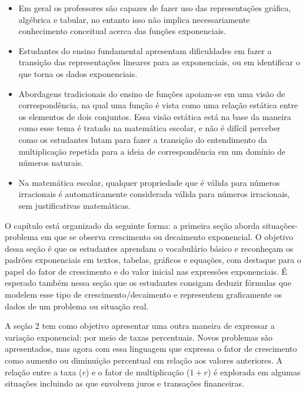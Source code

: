 \begin{apresentacao}
\begin{itemize}
\item Em geral os professores são capazes de fazer uso das representações gráfica, algébrica e tabular, no entanto isso não implica necessariamente conhecimento conceitual acerca das funções exponenciais. \citep{Presmeg2005}

\item Estudantes do ensino fundamental apresentam dificuldades em fazer a transição das representações lineares para as exponenciais, ou em identificar o que torna os dados exponenciais. \citep{Alagic2006}

\item Abordagens tradicionais do ensino de funções apoiam-se em uma visão de correspondência, na qual uma função é vista como uma relação estática entre os elementos de dois conjuntos. Essa visão estática está na base da maneira como esse tema é tratado na matemática escolar, e não é difícil perceber como os estudantes lutam para fazer a transição do entendimento da multiplicação repetida para a ideia de correspondência em um domínio de números naturais. \citep{Ellis2012}

\item Na matemática escolar, qualquer propriedade que é válida para números irracionais é automaticamente considerada válida para números irracionais, sem justificativas matemáticas. \citep{Wu2011}

\end{itemize}

O capítulo está organizado da seguinte forma: a primeira seção aborda situações-problema em que se observa crescimento ou decaimento exponencial. O objetivo dessa seção é que os estudantes aprendam o vocabulário básico e reconheçam os padrões exponenciais em textos, tabelas, gráficos e equações, com destaque para o papel do fator de crescimento e do valor inicial nas expressões exponenciais. É esperado também nessa seção que os estudantes consigam deduzir fórmulas que modelem esse tipo de crescimento/decaimento e representem graficamente os dados de um problema ou situação real.

A seção 2 tem como objetivo apresentar uma outra maneira de expressar a variação exponencial: por meio de taxas percentuais. Novos problemas são apresentados, mas agora com essa linguagem que expressa o fator de crescimento como aumento ou diminuição percentual em relação aos valores anteriores. A relação entre a taxa ($r$) e o fator de multiplicação ($1+r$) é explorada em algumas situações incluindo as que envolvem juros e transações financeiras.


\end{apresentacao}
